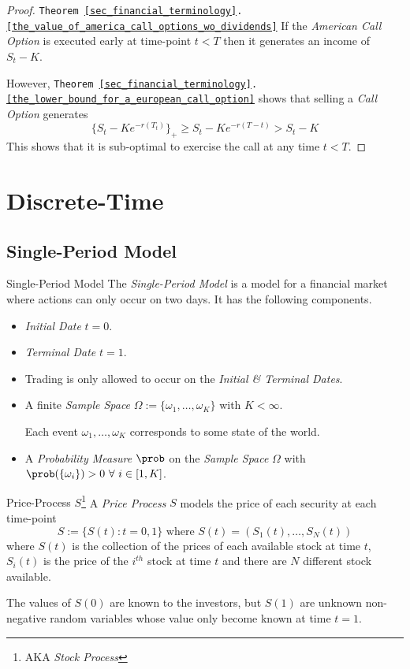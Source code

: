 \documentclass[11pt,a4paper]{article}
\begin{document}
  \begin{proof}{\texttt{Theorem \ref{sec_financial_terminology}.\ref{the_value_of_america_call_options_wo_dividends}}}
    If the \textit{American Call Option} is executed early at time-point $t<T$ then it generates an income of $S_t-K$.
    \par However, \texttt{Theorem \ref{sec_financial_terminology}.\ref{the_lower_bound_for_a_european_call_option}} shows that selling a \textit{Call Option} generates
    \[ \{S_t-Ke^{-r(T_t)}\}_+\geq S_t-Ke^{-r(T-t)}>S_t-K \]
    This shows that it is sub-optimal to exercise the call at any time $t<T$.
  \end{proof}

\section{Discrete-Time}\label{sec_discrete_time_models}

\subsection{Single-Period Model}

  \begin{definition}{Single-Period Model}
    The \textit{Single-Period Model} is a model for a financial market where actions can only occur on two days. It has the following components.
    \begin{itemize}
      \item \textit{Initial Date} $t=0$.
      \item \textit{Terminal Date} $t=1$.
      \item Trading is only allowed to occur on the \textit{Initial \& Terminal Dates}.
      \item A finite \textit{Sample Space} $\Omega:=\{\omega_1,\dots,\omega_K\}$ with $K<\infty$.
      \par Each event $\omega_1,\dots,\omega_K$ corresponds to some state of the world.
      \item A \textit{Probability Measure} $\prob$ on the \textit{Sample Space} $\Omega$ with $\prob(\{\omega_i\})>0\ \forall\ i\in[1,K]$.
    \end{itemize}
  \end{definition}

  \begin{definition}{Price-Process $S$\footnote{AKA \textit{Stock Process}}}
    A \textit{Price Process} $S$ models the price of each security at each time-point
    \[ S:=\{S(t):t=0,1\}\text{ where }S(t)=(S_1(t),\dots,S_N(t)) \]
    where $S(t)$ is the collection of the prices of each available stock at time $t$, $S_i(t)$ is the price of the $i^{th}$ stock at time $t$ and there are $N$ different stock available.
    \par The values of $S(0)$ are known to the investors, but $S(1)$ are unknown non-negative random variables whose value only become known at time $t=1$.
  \end{definition}
\end{document}
